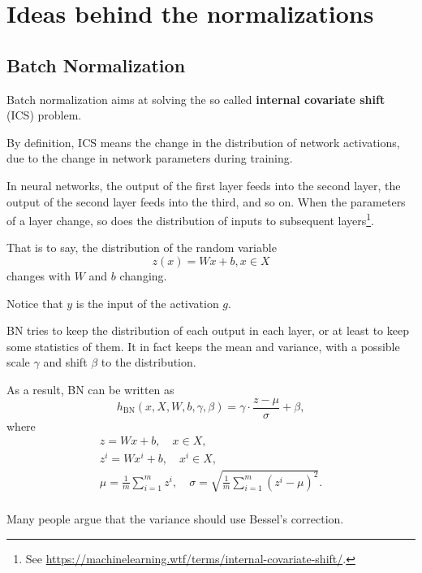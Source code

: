 \newpage
\section{Ideas behind the normalizations}
\subsection{Batch Normalization}
Batch normalization aims at solving the so called \textbf{internal covariate shift} (ICS) problem. 

By definition, ICS means the change in the distribution of network activations, due to the change in network parameters during training.

In neural networks, the output of the first layer feeds into the second layer, the output of the second layer feeds into the third, and so on. When the parameters of a layer change, so does the distribution of inputs to subsequent layers\footnote{See \href{this}{https://machinelearning.wtf/terms/internal-covariate-shift/}.}.

That is to say, the distribution of the random variable 
\begin{equation}
z(x)=Wx+b,x\in X
\end{equation}
changes with $W$ and $b$ changing.

Notice that $y$ is the input of the activation $g$.

BN tries to keep the distribution of each output in each layer, or at least to keep some statistics of them. It in fact keeps the mean and variance, with a possible scale $\gamma$ and shift $\beta$ to the distribution.

As a result, BN can be written as
\begin{equation}
h_{\text{BN}}(x,X,W,b,\gamma,\beta)=\gamma\cdot\frac{z-\mu}{\sigma}+\beta,
\end{equation}
where
\begin{equation}
\begin{aligned}
z=Wx+b,\quad x\in X,\\
z^i=Wx^i+b,\quad x^i\in X,\\
\mu=\frac{1}{m}\sum_{i=1}^m z^i,\quad \sigma=\sqrt{\frac{1}{m}\sum_{i=1}^m(z^i-\mu)^2}.\\		
\end{aligned}
\end{equation}

Many people argue that the variance should use Bessel's correction.
\newpage
